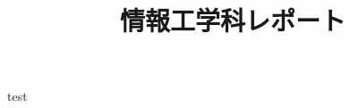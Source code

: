 \documentclass[a4paper, dvipdfmx]{jsarticle}
\title{情報工学科レポート}
\author{}
\begin{document}
\maketitle
\thispagestyle{empty}
\section{}
test

\end{document}
